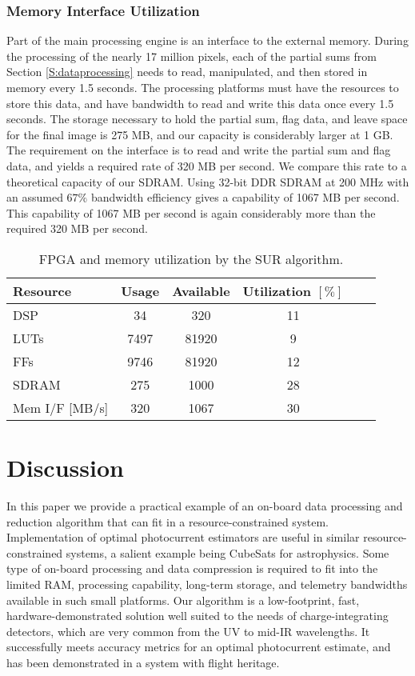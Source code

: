 \documentclass{ws-jai}
\begin{document}
\subsubsection{Memory Interface Utilization}
\label{ssS:memaimplimentation}

Part of the main processing engine is an interface to the external
memory. During the processing of the nearly 17 million pixels, each of
the partial sums from Section \ref{S:dataprocessing} needs to read,
manipulated, and then stored in memory every 1.5 seconds.  The
processing platforms must have the resources to store this data, and
have bandwidth to read and write this data once every 1.5 seconds. The
storage necessary to hold the partial sum, flag data, and leave space
for the final image is 275 MB, and our capacity is considerably larger
at 1 GB. The requirement on the interface is to read and write the
partial sum and flag data, and yields a required rate of 320 MB per
second. We compare this rate to a theoretical capacity of our
SDRAM. Using 32-bit DDR SDRAM at 200 MHz with an assumed $67\%$
bandwidth efficiency gives a capability of 1067 MB per second. This
capability of 1067 MB per second is again considerably more than the
required 320 MB per second.

\begin{table}
\small
\centering
\caption{FPGA and memory utilization by the SUR algorithm. \label{tab:utilization}}
\begin{tabular}{lccccc}
\hline
Resource & Usage & Available & Utilization $[\%]$  \\ \hline

DSP  & 34 & 320 &11 \\ 
LUTs & 7497 & 81920 & 9 \\ 
FFs & 9746 & 81920 & 12 \\ 
SDRAM & 275 & 1000 & 28 \\ 
Mem I/F [MB/s] & 320 & 1067 & 30 \\ \hline

\end{tabular}
\end{table}


\section{Discussion}
\label{S:discussion}

In this paper we provide a practical example of an on-board data
processing and reduction algorithm that can fit in a
resource-constrained system.  Implementation of optimal photocurrent
estimators are useful in similar resource-constrained systems, a
salient example being CubeSats for astrophysics.  Some type of
on-board processing and data compression is required to fit into the
limited RAM, processing capability, long-term storage, and telemetry
bandwidths available in such small platforms.  Our algorithm is a
low-footprint, fast, hardware-demonstrated solution well suited to the
needs of charge-integrating detectors, which are very common from the
UV to mid-IR wavelengths.  It successfully meets accuracy metrics for
an optimal photocurrent estimate, and has been demonstrated in a
system with flight heritage.
\end{document}
